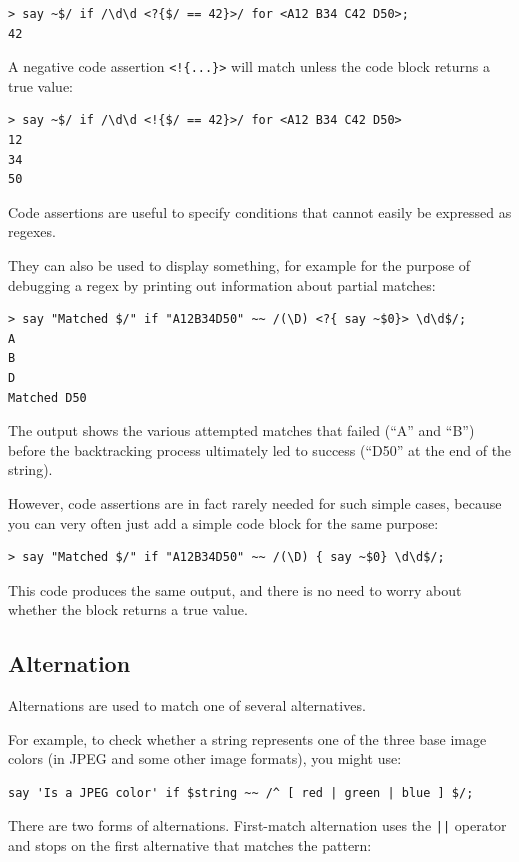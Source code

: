 \begin{verbatim}
> say ~$/ if /\d\d <?{$/ == 42}>/ for <A12 B34 C42 D50>;
42
\end{verbatim}

A negative code assertion \verb'<!{...}>' will 
match unless the code block returns a true value:
\begin{verbatim}
> say ~$/ if /\d\d <!{$/ == 42}>/ for <A12 B34 C42 D50>
12
34
50
\end{verbatim}

Code assertions are useful to specify conditions that 
cannot easily be expressed as regexes. 

They can also be used to display something, for example 
for the purpose of debugging a regex by printing out 
information about partial matches:

\begin{verbatim}
> say "Matched $/" if "A12B34D50" ~~ /(\D) <?{ say ~$0}> \d\d$/;
A
B
D
Matched D50
\end{verbatim}

The output shows the various attempted matches that 
failed (``A'' and ``B'') before the backtracking 
process ultimately led to success (``D50'' at the end 
of the string).

However, code assertions are in fact rarely needed for 
such simple cases, because you can very often just add 
a simple code block for the same purpose:
%
\begin{verbatim}
> say "Matched $/" if "A12B34D50" ~~ /(\D) { say ~$0} \d\d$/;
\end{verbatim}
This code produces the same output, and there is no need 
to worry about whether the block returns a true value.


\subsection{Alternation}

Alternations are used to match one of several alternatives.

For example, to check whether a string represents one of the 
three base image colors (in JPEG and some other image formats), 
you might use:

\begin{verbatim}
say 'Is a JPEG color' if $string ~~ /^ [ red | green | blue ] $/;
\end{verbatim}
%

There are two forms of alternations. First-match alternation 
uses the \verb'||' operator and stops on the first alternative 
that matches the pattern:

